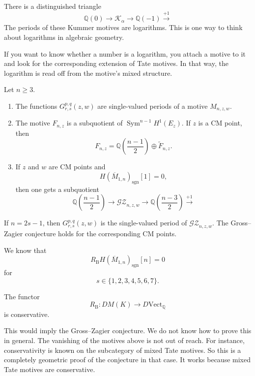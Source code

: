 There is a distinguished triangle
\[
        \mathbb Q(0)
        \to
        \mathcal K_\alpha
        \to
        \mathbb Q(-1)
        \xrightarrow{+1}
\]
The periods of these Kummer motives
are logarithms.
This is one way to think about
logarithms in algebraic geometry.

If you want to know whether a number
is a logarithm, you attach a motive to
it and look for the corresponding
extension of Tate motives.
In that way, the logarithm is read off
from the motive's mixed structure.

\begin{theorem}
\label{theorem-let-n}
Let $n\geq 3$.
\begin{enumerate}
\item The functions
$G_{r,s}^{p,q}(z,w)$ are single-valued
periods of a motive
$M_{n,z,w}$.
\item The motive $F_{n,z}$ is a
subquotient of
$\operatorname{Sym}^{n-1}H^1(E_z)$.
If $z$ is a CM point, then
\[
        F_{n,z}
        =
        \mathbb Q\!\left(
        \frac{n-1}{2}
        \right)
        \oplus
        \widetilde F_{n,z}.
\]
\item If $z$ and $w$ are CM points and
\[
        H(\overline M_{1,n})
        _{\operatorname{sgn}}[1]
        =0,
\]
then one gets a subquotient
\[
        \mathbb Q\!\left(\frac{n-1}{2}\right)
        \to
        \mathcal{GZ}_{n,z,w}
        \to
        \mathbb Q\!\left(\frac{n-3}{2}\right)
        \xrightarrow{+1}
\]
\end{enumerate}
If $n=2s-1$, then
$G_{r,s}^{p,q}(z,w)$ is the
single-valued period of
$\mathcal{GZ}_{n,z,w}$.
The Gross--Zagier conjecture holds
for the corresponding CM points.
\end{theorem}

We know that
\[
        R_{\mathrm{B}}
        H(\overline M_{1,n})
        _{\operatorname{sgn}}[n]
        =0
\]
for
\[
        s\in\{1,2,3,4,5,6,7\}.
\]

\begin{remark}
\label{remark-functor-r}
The functor
\[
        R_{\mathrm{B}}:DM(K)\to
        D\mathrm{Vect}_{\mathbb Q}
\]
is conservative.
\end{remark}

This would imply the Gross--Zagier
conjecture.
We do not know how to prove this in
general.
The vanishing of the motives above is
not out of reach.
For instance, conservativity is known
on the subcategory of mixed Tate
motives.
So this is a completely geometric
proof of the conjecture in that case.
It works because mixed Tate motives
are conservative.

